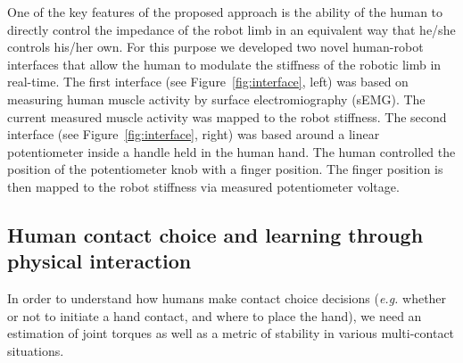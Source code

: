 \documentclass[final,5p,twocolumn]{elsarticle}
\begin{document}
One of the key features of the proposed approach is the ability of the human to directly control the impedance of the robot limb in an equivalent way that he/she controls his/her own. For this purpose we developed two novel human-robot interfaces \cite{Peternel2014,Peternel2015} that allow the human to modulate the stiffness of the robotic limb in real-time. The first interface (see Figure~\ref{fig:interface}, left) was based on measuring human muscle activity by surface electromiography (sEMG). The current measured muscle activity was mapped to the robot stiffness. The second interface (see Figure~\ref{fig:interface}, right) was based around a linear potentiometer inside a handle held in the human hand. The human controlled the position of the potentiometer knob with a finger position. The finger position is then mapped to the robot stiffness via measured potentiometer voltage.




\subsection{Human contact choice and learning through physical interaction}
In order to understand how humans make contact choice decisions (\textit{e.g.} whether or not to initiate a hand contact, and where to place the hand), we need an estimation of joint torques as well as a metric of stability in various multi-contact situations.

\end{document}
